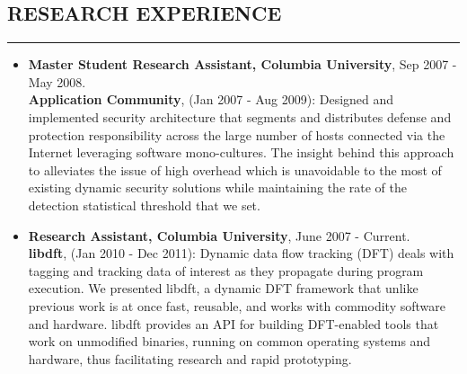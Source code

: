 \documentclass[10pt,a4]{article}
\begin{document}
\begin{small}
\begin{itemize}
\end{itemize}

\subsection*{RESEARCH EXPERIENCE}
\hrule
\vspace{0.2cm}
\begin{itemize}
\item {\bf Master Student Research Assistant, Columbia University}, Sep 2007 - May 2008. \\
%
  {\bf Application Community}, (Jan 2007 - Aug 2009): Designed and implemented
  security architecture that segments and distributes defense and protection
  responsibility across the large number of hosts connected via the Internet
  leveraging software mono-cultures. The insight behind this approach to
  alleviates the issue of high overhead which is unavoidable to the most of
  existing dynamic security solutions while maintaining the rate of the
  detection statistical threshold that we set.

\vspace{0.1cm}
\item  {\bf Research Assistant, Columbia University}, June 2007 - Current. \\
%
%   
  {\bf libdft}, (Jan 2010 - Dec 2011): Dynamic data flow tracking (DFT) deals
  with tagging and tracking data of interest as they propagate during program
  execution.  We presented libdft, a dynamic DFT framework that unlike previous
  work is at once fast, reusable, and works with commodity software and
  hardware. libdft provides an API for building DFT-enabled tools that work on
  unmodified binaries, running on common operating systems and hardware, thus
  facilitating research and rapid prototyping.\\


\end{itemize}
\end{small}
\end{document}
